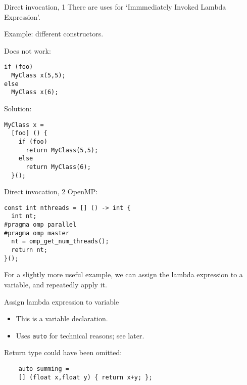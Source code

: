 \begin{block}{Direct invocation, 1}
  \label{sl:lambda-iile}
  There are uses for `Immmediately Invoked Lambda Expression'.

  Example: different constructors.
  \lstset{numbers=left,numberstyle=\tiny}
\begin{multicols}{2}
    Does not work:
\begin{lstlisting}
if (foo)
  MyClass x(5,5);
else
  MyClass x(6);
\end{lstlisting}
\columnbreak
Solution:
\begin{lstlisting}
MyClass x = 
  [foo] () {
    if (foo)
      return MyClass(5,5);
    else
      return MyClass(6);
  }();
\end{lstlisting}
\end{multicols}
\end{block}

\begin{block}{Direct invocation, 2}
  \label{sl:lambda-omp}
  OpenMP:
  \lstset{numbers=left,numberstyle=\tiny}
\begin{lstlisting}
const int nthreads = [] () -> int {
  int nt;
#pragma omp parallel
#pragma omp master
  nt = omp_get_num_threads();
  return nt;
}();
\end{lstlisting}
\end{block}

For a slightly more useful example,
we can assign the lambda expression to a variable, and repeatedly apply it.

\begin{block}{Assign lambda expression to variable}
  \label{sl:lambdavar}
\def\snippetcodefraction{.67}
\def\snippetanswfraction{.3}  
\begin{itemize}
\item This is a variable declaration.
\item Uses \lstinline+auto+ for technical reasons; see later.
\end{itemize}
Return type could have been omitted:
\begin{lstlisting}
    auto summing = 
    [] (float x,float y) { return x+y; };
\end{lstlisting}
\end{block}

